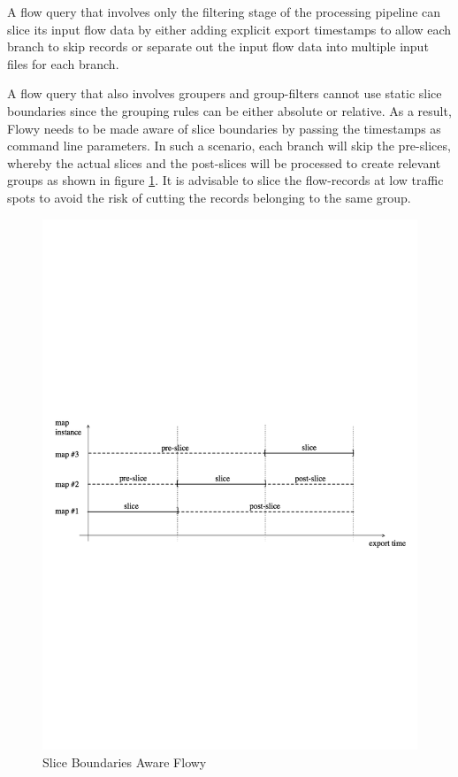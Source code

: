 A flow query that involves only the filtering stage of the processing pipeline
can  slice its input flow data by
either adding explicit export timestamps to allow each branch to skip records
or separate out the input flow data into multiple input files for each branch.

A flow query that also involves groupers and group-filters cannot use static
slice boundaries since the grouping rules can be either absolute or relative.
As a result, Flowy needs to be made aware of slice boundaries by passing the
timestamps  as command line
parameters. In such a scenario, each branch will skip the pre-slices, whereby
the actual slices and the post-slices will be processed to create relevant
groups as shown in figure \ref{fig:flowy-grouper-slices}. It is advisable to
slice the flow-records at low traffic spots to avoid the risk of cutting the
records belonging to the same group.

\begin{figure}[h!]
\begin{center}
  \includegraphics* [width=0.7\linewidth]{figures/flowy-grouper-slices}
  \caption{Slice Boundaries Aware Flowy \cite{pnemeth:thesis:2010}}
  \label{fig:flowy-grouper-slices}
\end{center}
\end{figure}

